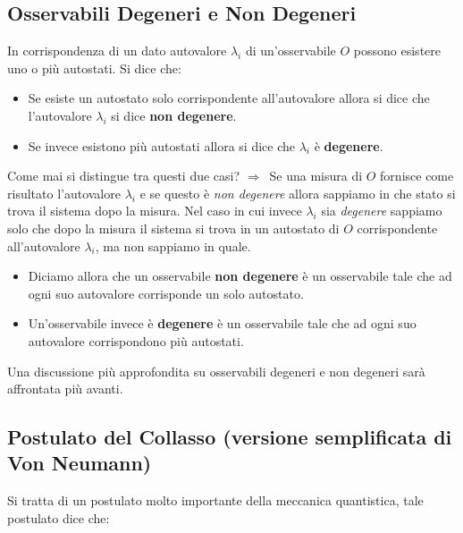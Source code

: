 \subsection{Osservabili Degeneri e Non Degeneri}
	
	In corrispondenza di un dato autovalore $\lambda_i$ di un'osservabile $O$ possono esistere uno o più autostati. Si dice che:

\begin{mydef}
\begin{itemize}
	\item Se esiste un autostato solo corrispondente all'autovalore allora si dice che l'autovalore $\lambda_i$ si dice \textbf{non degenere}.
	\item Se invece esistono più autostati allora si dice che $\lambda_i$ è \textbf{degenere}.
\end{itemize}
\end{mydef}

	Come mai si distingue tra questi due casi? $\Rightarrow \, $ Se una misura di $O$ fornisce come risultato l'autovalore $\lambda_i$ e se questo è \textit{non degenere} allora sappiamo in che stato si trova il sistema dopo la misura. Nel caso in cui invece $\lambda_i$ sia \textit{degenere} sappiamo solo che dopo la misura il sistema si trova in un autostato di $O$ corrispondente all'autovalore $\lambda_i$, ma non sappiamo in quale.

\begin{mydef}
\begin{itemize}
	\item Diciamo allora che un osservabile \textbf{non degenere} è un osservabile tale che ad ogni suo autovalore corrisponde un solo autostato. 
	\item Un'osservabile invece è \textbf{degenere} è un osservabile tale che ad ogni suo autovalore corrispondono più autostati.
\end{itemize}
\end{mydef}

	Una discussione più approfondita su osservabili degeneri e non degeneri sarà affrontata più avanti.
	
\subsection{Postulato del Collasso (versione semplificata di Von Neumann)}

	Si tratta di un postulato molto importante della meccanica quantistica, tale postulato dice che:

